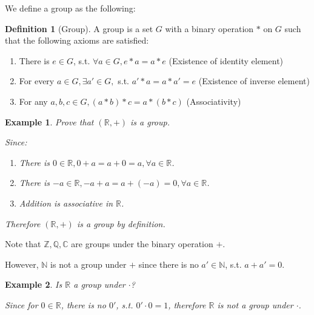 \documentclass{article}
\theoremstyle{MyNonumberplain}
\theoremstyle{break}
\newcommand{\R}{\mathbb{R}}
\newcommand{\Q}{\mathbb{Q}}
\newcommand{\Z}{\mathbb{Z}}
\newcommand{\N}{\mathbb{N}}
\newcommand{\C}{\mathbb{C}}
\theoremstyle{break}
\newtheorem{example}{Example}[section]
\theoremstyle{break}
\theoremstyle{definition}
\theoremstyle{break}
\newtheorem{definition}{Definition}[section]
\begin{document}
We define a group as the following:

\begin{defbox}
    \begin{definition}[Group]
        A group is a set $G$ with a binary operation $*$ on $G$ such that the following axioms are satisfied:\bigskip
        \begin{enumerate}
            \item There is $e\in G$, s.t. $\forall a\in G, e*a=a*e$ (Existence of identity element)\bigskip
            \item For every $a\in G,\exists a'\in G,$ s.t. $a'*a=a*a'=e$ (Existence of inverse element)\bigskip
            \item For any $a,b,c\in G, (a*b)*c=a*(b*c)$ (Associativity)
        \end{enumerate}
    \end{definition}
\end{defbox}

\begin{expbox}
    \begin{example}
        Prove that $(\R,+)$ is a group.

\begin{ansbox}
    Since: \bigskip
    \begin{enumerate}       
        \item There is $0\in\R,0+a=a+0=a,\forall a\in\R$.\bigskip
        \item There is $-a\in\R,-a+a=a+(-a)=0,\forall a\in\R$.\bigskip
        \item Addition is associative in $\R$.\bigskip
    \end{enumerate}
    
    Therefore $(\R,+)$ is a group by definition.
\end{ansbox}
    \end{example}
\end{expbox}

Note that $\Z,\Q,\C$ are groups under the binary operation $+$.

However, $\N$ is not a group under $+$ since there is no $a'\in\N$, s.t. $a+a'=0$.

\begin{expbox}
    \begin{example}
        Is $\R$ a group under $\cdot$?
        \begin{ansbox}
            Since for $0\in\R$, there is no $0'$, s.t. $0'\cdot 0=1$, therefore $\R$ is not a group under $\cdot$.
        \end{ansbox}
    \end{example}
\end{expbox}
\end{document}
